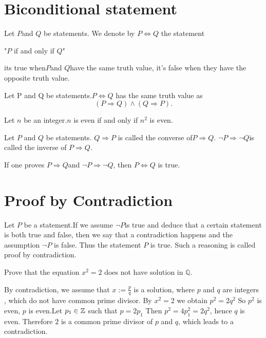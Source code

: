 \documentclass{book}
\numberwithin{equation}{section}
\begin{document}
\section{Biconditional statement}
\begin{definitionenv}
    Let $P$and $Q$ be statements. We denote by $P\Leftrightarrow Q$ the statement
    \begin{center}
        "$P$ if and only if $Q$"
    \end{center}
    its true when$P$and $Q$have the same truth value, it's false when they have the opposite truth value.
\end{definitionenv}
\begin{propositionenv}
    Let P and Q be statements.$P \Leftrightarrow Q$ has the same truth value as 
    $$(P\Rightarrow Q)\wedge (Q\Rightarrow P).$$
\end{propositionenv}
\begin{exampleenv}
    Let $n$ be an integer.$n$ is even if and only if $n^2$ is even.
\end{exampleenv}
\begin{definitionenv}
    Let $P$ and $Q$ be statements.
    \newline
    $Q\Rightarrow P$ is called the converse of$P\Rightarrow Q$.
    \newline
    $\neg P \Rightarrow \neg Q$is called the inverse of $P\Rightarrow Q$.
\end{definitionenv}
\begin{remark}
    If one proves $P\Rightarrow Q$and $\neg P\Rightarrow \neg Q$, then $P \Leftrightarrow Q$ is true.
\end{remark}




\section{Proof by Contradiction}
\begin{definitionenv}
    Let $P$ be a statement.If we assume $\neg P$is true and deduce that a certain statement is both true and false,  then we say that a contradiction happens and the assumption $\neg P$ is false. Thus the statement $P$ is true. Such a reasoning is called proof by contradiction.
\end{definitionenv}
\begin{exampleenv}
    Prove that the equation $x^2=2$ does not have solution in $\mathbb{Q}$.
\end{exampleenv}
    \begin{proofenv}
        By contradiction, we assume that $x:=\frac{p}{q}$ is a solution, where $p$ and $q$ are integers , which do not have common prime divisor. By $x^2=2$ we obtain $p^2=2q^2$
        So $p^2$ is even, $p$ is even.Let $p_1\in \mathbb{Z}$ such that $p=2p_1$
        Then $p^2=4p_1^2=2q^2$,  hence $q$ is even. Therefore $2$ is a common prime divisor of $p$ and $q$, which leads to a contradiction.
    \end{proofenv}
\end{document}

